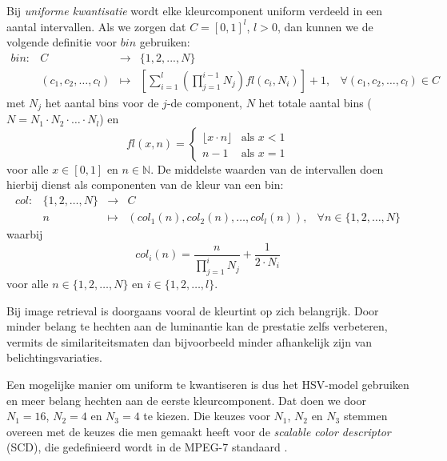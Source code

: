 Bij \emph{uniforme kwantisatie} wordt elke kleurcomponent uniform verdeeld in een 
aantal intervallen. Als we zorgen dat $C=[0,1]^l$, $l > 0$, dan kunnen we de 
volgende definitie voor $bin$ gebruiken:
\begin{displaymath}
\begin{array}{lrcll}
bin: & C & \to & \{1,2,...,N\}\\[5pt] & (c_1,c_2,\ldots,c_l) & \mapsto & \left[ 
\displaystyle\sum_{i=1}^l \left( \prod_{j=1}^{i-1} N_j \right) \mathit{fl}(c_i, N_i) \right] 
+ 1, & \forall (c_1,c_2,\ldots,c_l) \in C
\end{array}
\end{displaymath}
met $N_j$ het aantal bins voor de $j$-de component, $N$ het totale aantal 
bins ($N=N_1 \cdot N_2 \cdot \ldots \cdot N_l$) en 
\begin{displaymath}
\mathit{fl}(x,n) = \begin{cases}
\lfloor x \cdot n \rfloor & \textrm{als } x < 1 \\ 
n - 1 & \textrm{als } x = 1
\end{cases}
\end{displaymath}
voor alle $x \in [0,1]$ en $n \in \mathbb{N}$. De middelste waarden van de 
intervallen doen hierbij dienst als componenten van de kleur van een bin:
\begin{displaymath}
\begin{array}{lrcll}
col: & \{1,2,\ldots,N\} & \to & C \\ & n & \mapsto & (col_1(n), col_2(n), 
\dots, col_l(n)), & \forall n \in \{1,2,\ldots,N\}
\end{array}
\end{displaymath}
waarbij 
\begin{displaymath}
col_i(n) = \frac{n}{\prod_{j=1}^i N_j} + \frac{1}{2 \cdot N_i}
\end{displaymath} 
voor alle $n \in \{1,2,\ldots,N\}$ en $i \in \{1,2,\ldots,l\}$.

Bij image retrieval is doorgaans vooral de kleurtint op zich belangrijk. Door
minder belang te hechten aan de luminantie kan de prestatie zelfs verbeteren,
vermits de similariteitsmaten dan bijvoorbeeld minder afhankelijk zijn van
belichtingsvariaties. 

Een mogelijke manier om uniform te kwantiseren is dus
het HSV-model gebruiken en meer belang hechten aan de eerste kleurcomponent. 
Dat doen we door $N_1=16$, $N_2=4$ en $N_3=4$ te kiezen.
Die keuzes voor $N_1$, $N_2$ en $N_3$ stemmen overeen met de keuzes die men 
gemaakt heeft voor de \emph{scalable color descriptor} (SCD), die gedefinieerd 
wordt in de MPEG-7 standaard \cite{manjunath:color_and_texture_descriptors}.

